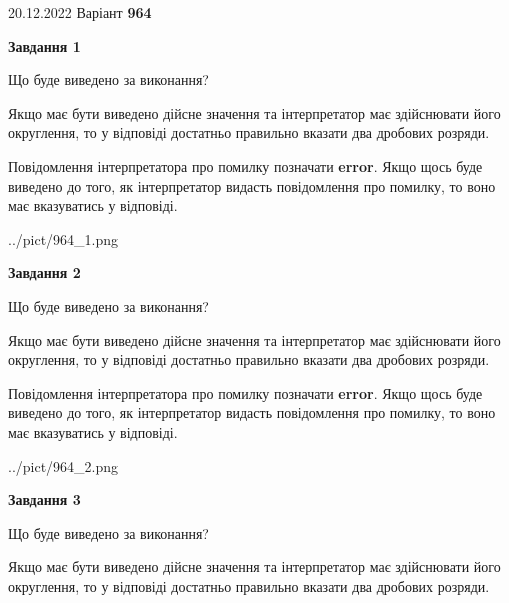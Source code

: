 \documentclass[12pt, ukrainian]{article}
\begin{document}
{20.12.2022 Варіант \No \textbf { 964 }\par}
{
\begin {Large}

{\begin {center}\textbf{Завдання 1}\end {center}}\par
Що буде виведено за виконання? \par

Якщо має бути виведено дійсне значення та інтерпретатор має здійснювати його округлення, 
то у відповіді достатньо правильно вказати два дробових розряди.

Повідомлення інтерпретатора про помилку позначати \textbf{error}.
Якщо щось буде виведено до того, як інтерпретатор видасть повідомлення про помилку, 
то воно має вказуватись у відповіді. \par

\begin{center}
	{../pict/964_1.png}
\end{center}
\newpage

{\begin {center}\textbf{Завдання 2}\end {center}}\par
Що буде виведено за виконання? \par

Якщо має бути виведено дійсне значення та інтерпретатор має здійснювати його округлення, 
то у відповіді достатньо правильно вказати два дробових розряди.

Повідомлення інтерпретатора про помилку позначати \textbf{error}.
Якщо щось буде виведено до того, як інтерпретатор видасть повідомлення про помилку, 
то воно має вказуватись у відповіді. \par

\begin{center}
	{../pict/964_2.png}
\end{center}
\newpage

{\begin {center}\textbf{Завдання 3}\end {center}}\par
Що буде виведено за виконання? \par

Якщо має бути виведено дійсне значення та інтерпретатор має здійснювати його округлення, 
то у відповіді достатньо правильно вказати два дробових розряди.


\end{Large}}
\end{document}
